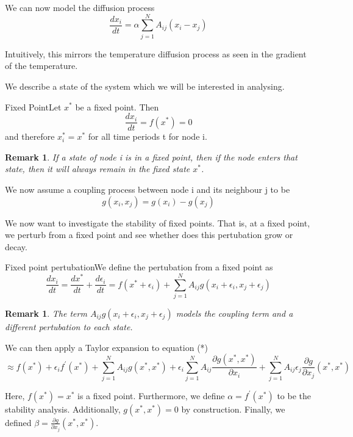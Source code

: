 \documentclass[twoside]{article}
\newtheorem{remark}[theorem]{Remark}
\begin{document}
We can now model the diffusion process 
$$
\frac{dx_i}{dt} = \alpha \sum_{j=1}^{N}A_{ij}(x_i - x_j)
$$

Intuitively, this mirrors the temperature diffusion process as seen in the gradient of the temperature. 

We describe a state of the system which we will be interested in analysing.
\begin{definition_exam}{Fixed Point}{}Let $x^*$ be a fixed point. Then 
$$
\frac{dx_i}{dt} = f(x^*) = 0
$$
and therefore $x_i^* = x^*$ for all time periods t for node i.
\end{definition_exam}

\begin{remark}If a state of node i is in a fixed point, then if the node enters that state, then it will always remain in the fixed state $x^*$.
\end{remark}

We now assume a coupling process between node i and its neighbour j to be
$$
g(x_i, x_j) = g(x_i) - g(x_j)
$$

We now want to investigate the stability of fixed points. That is, at a fixed point, we perturb from a fixed point and see whether does this pertubation grow or decay.

\begin{proposition_exam}{Fixed point pertubation}{}We define the pertubation from a fixed point as
\begin{equation}
\frac{dx_i}{dt} = \frac{dx^*}{dt} + \frac{d\epsilon_i}{dt} = f(x^* + \epsilon_i) + \sum_{j=1}^{N}A_{ij}g(x_i + \epsilon_i, x_j + \epsilon_j)
\tag{*}
\end{equation}
\end{proposition_exam}

\begin{remark}The term $A_{ij}g(x_i + \epsilon_i, x_j + \epsilon_j)$ models the coupling term and a different pertubation to each state.
\end{remark}

We can then apply a Taylor expansion to equation (*)
$$
\approx f(x^*) + \epsilon_if^{'}(x^*) + \sum_{j=1}^{N}A_{ij}g(x^*, x^*) + \epsilon_i\sum_{j=1}^{N}A_{ij}\frac{\partial g(x^*,x^*)}{\partial x_i} + \sum_{j=1}^{N}A_{ij}\epsilon_j\frac{\partial g}{\partial x_j}(x^*, x^*)
$$

Here, $f(x^*) = x^*$ is a fixed point. Furthermore, we define $\alpha = f^{'}(x^*)$ to be the stability analysis. Additionally, $g(x^*,x^*) = 0$ by construction. Finally, we defined $\beta = \frac{\partial g}{\partial x_j}(x^*, x^*)$. 
\end{document}

